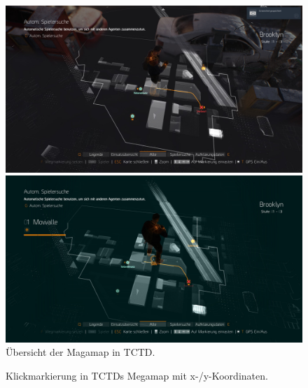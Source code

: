 \begin{figure}[h!]
    \centering
    \includegraphics[width=\linewidth]{figures/concept/the_division_overlap}

    \includegraphics[width=\linewidth]{figures/concept/the_division_5}
    
    \caption{Übersicht der Magamap in TCTD.}
    \label{fig:tctd_overview}
\end{figure}

\begin{figure}[tbh]
    \centering
    \caption{Klickmarkierung in TCTDs Megamap mit x-/y-Koordinaten.}
    \label{fig:tctd_clickmarker}
\end{figure}

